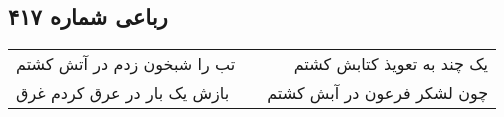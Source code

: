 \begin{center}
\section*{رباعی شماره ۴۱۷}
\label{sec:sh417}
\begin{longtable}{l p{0.5cm} r}
تب را شبخون زدم در آتش کشتم
&&
یک چند به تعویذ کتابش کشتم
\\
بازش یک بار در عرق کردم غرق
&&
چون لشکر فرعون در آبش کشتم
\\
\end{longtable}
\end{center}
